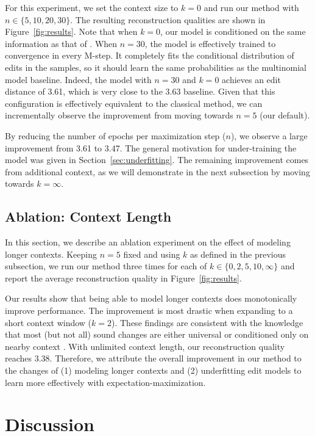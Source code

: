 \documentclass[11pt]{article}
\begin{document}
For this experiment, we set the context size to $k=0$ and run our method with $n \in \{5, 10, 20, 30\}$. The resulting reconstruction qualities are shown in Figure~\ref{fig:results}. Note that when $k=0$, our model is conditioned on the same information as that of \citet{bouchard-cote-etal-2009-improved}. When $n=30$, the model is effectively trained to convergence in every M-step. It completely fits the conditional distribution of edits in the samples, so it should learn the same probabilities as the multinomial model baseline. Indeed, the model with $n=30$ and $k=0$ achieves an edit distance of 3.61, which is very close to the 3.63 baseline. Given that this configuration is effectively equivalent to the classical method, we can incrementally observe the improvement from moving towards $n=5$ (our default). 

By reducing the number of epochs per maximization step ($n$), we observe a large improvement from 3.61 to 3.47. The general motivation for under-training the model was given in Section~\ref{sec:underfitting}. The remaining improvement comes from additional context, as we will demonstrate in the next subsection by moving towards $k=\infty$. 

\subsection{Ablation: Context Length}
\label{sec:contextablation}
In this section, we describe an ablation experiment on the effect of modeling longer contexts. Keeping $n=5$ fixed and using $k$ as defined in the previous subsection, we run our method three times for each of $k \in \{0, 2, 5, 10, \infty\}$ and report the average reconstruction quality in Figure~\ref{fig:results}.



Our results show that being able to model longer contexts does monotonically improve performance. The improvement is most drastic when expanding to a short context window ($k=2$). These findings are consistent with the knowledge that most (but not all) sound changes are either universal or conditioned only on nearby context \citep{campbell2013historical, Hock+2021}. With unlimited context length, our reconstruction quality reaches 3.38. Therefore, we attribute the overall improvement in our method to the changes of (1) modeling longer contexts and (2) underfitting edit models to learn more effectively with expectation-maximization. 


\section{Discussion}
\end{document}
